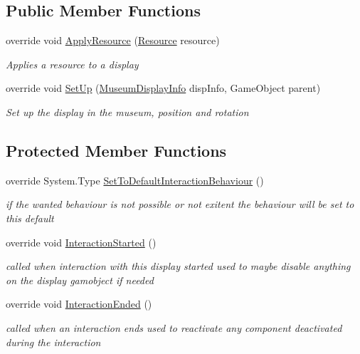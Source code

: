 \subsection*{Public Member Functions}
\begin{DoxyCompactItemize}
\item 
override void \mbox{\hyperlink{class_center_image_display_aca1aaf14b20d538cafb0c7731b8be2bb}{Apply\+Resource}} (\mbox{\hyperlink{class_resource}{Resource}} resource)
\begin{DoxyCompactList}\small\item\em Applies a resource to a display \end{DoxyCompactList}\item 
override void \mbox{\hyperlink{class_center_image_display_a3da996020c7d8abcd24f35660945703a}{Set\+Up}} (\mbox{\hyperlink{class_museum_display_info}{Museum\+Display\+Info}} disp\+Info, Game\+Object parent)
\begin{DoxyCompactList}\small\item\em Set up the display in the museum, position and rotation \end{DoxyCompactList}\end{DoxyCompactItemize}
\subsection*{Protected Member Functions}
\begin{DoxyCompactItemize}
\item 
override System.\+Type \mbox{\hyperlink{class_center_image_display_ac6ddf9c8df99ff76c0f508ba4e45a217}{Set\+To\+Default\+Interaction\+Behaviour}} ()
\begin{DoxyCompactList}\small\item\em if the wanted behaviour is not possible or not exitent the behaviour will be set to this default \end{DoxyCompactList}\item 
override void \mbox{\hyperlink{class_center_image_display_a2944541a38bcc65b7fff15200c9f0fc3}{Interaction\+Started}} ()
\begin{DoxyCompactList}\small\item\em called when interaction with this display started used to maybe disable anything on the display gamobject if needed \end{DoxyCompactList}\item 
override void \mbox{\hyperlink{class_center_image_display_ac78f5ea36aa445bb3d12124f1baf814d}{Interaction\+Ended}} ()
\begin{DoxyCompactList}\small\item\em called when an interaction ends used to reactivate any component deactivated during the interaction \end{DoxyCompactList}\end{DoxyCompactItemize}
